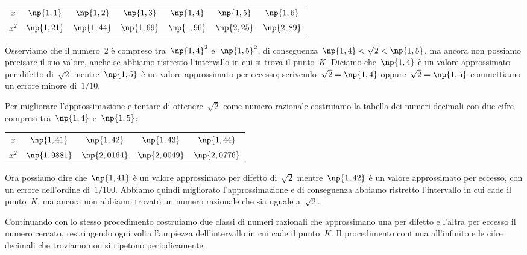 \begin{center}
\begin{tabular}{ccccccc}
\toprule
$x$ & $\np{1,1}$ & $\np{1,2}$ & $\np{1,3}$ & $\np{1,4}$ & $\np{1,5}$ & $\np{1,6}$\\
$x^{2}$ & $\np{1,21}$ & $\np{1,44}$ & $\np{1,69}$ & $\np{1,96}$ & $\np{2,25}$ & $\np{2,89}$\\
\bottomrule
\end{tabular}
\end{center}

Osserviamo che il numero~2 è compreso tra~$\np{1,4}^{2}$ e~$\np{1,5}^{2}$,
di conseguenza~$\np{1,4}<\sqrt{2}<\np{1,5}$, ma ancora
non possiamo precisare il suo valore, anche se abbiamo ristretto
l'intervallo in cui si trova il punto~$K$. Diciamo che~$\np{1,4}$ è un valore approssimato per
difetto di~$\sqrt{2}$ mentre~$\np{1,5}$
è un valore approssimato per eccesso; scrivendo~$\sqrt{2}=\np{1,4}$
oppure~$\sqrt{2}=\np{1,5}$ commettiamo un errore minore di~$1/10$.

Per migliorare l'approssimazione e tentare di ottenere~$\sqrt{2}$
come numero razionale costruiamo la tabella dei numeri
decimali con due cifre compresi tra~$\np{1,4}$ e~$\np{1,5}$:

\begin{center}
\begin{tabular}{ccccc}
\toprule
$x$ & $\np{1,41}$ & $\np{1,42}$ & $\np{1,43}$ & $\np{1,44}$\\
$x^{2}$ & $\np{1,9881}$ & $\np{2,0164}$ & $\np{2,0049}$ & $\np{2,0776}$\\
\bottomrule
\end{tabular}
\end{center}

Ora possiamo dire che~$\np{1,41}$ è un valore approssimato per difetto di~$\sqrt{2}$ mentre~$\np{1,42}$ è un valore approssimato
per eccesso, con un errore dell'ordine di~$1/100$. Abbiamo quindi migliorato
l'approssimazione e di conseguenza abbiamo ristretto l'intervallo in cui cade il punto~$K$, ma ancora non
abbiamo trovato un numero razionale che sia uguale a~$\sqrt{2}$.

Continuando con lo stesso procedimento costruiamo due classi di numeri razionali che approssimano una per difetto e
l'altra per eccesso il numero cercato, restringendo ogni volta l'ampiezza dell'intervallo in cui cade il punto~$K$.
Il procedimento continua all'infinito e le cifre decimali che troviamo non si ripetono periodicamente.

